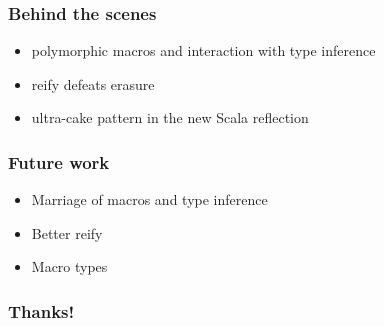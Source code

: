 \documentclass[hyperref={bookmarks=false}]{beamer}
\begin{document}
\begin{frame}[fragile]
\frametitle{Behind the scenes}

\begin{itemize}
\item polymorphic macros and interaction with type inference
\item reify defeats erasure
\item ultra-cake pattern in the new Scala reflection
\end{itemize}
\end{frame}

\begin{frame}[fragile]
\frametitle{Future work}

\begin{itemize}
\item Marriage of macros and type inference
\item Better reify
\item Macro types
\end{itemize}
\end{frame}

\begin{frame}[fragile]
\frametitle{Thanks!}

\centering
{}

\end{frame}
\end{document}
